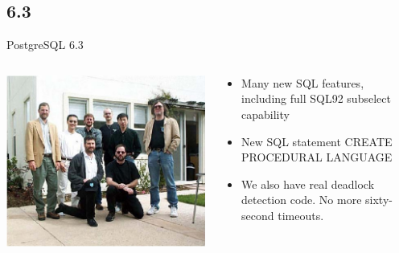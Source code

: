 \documentclass[t,10pt]{beamer}
\begin{document}
\subsection{6.3}
\begin{frame}{PostgreSQL 6.3}
  \begin{columns}[T]
    \begin{column}{0.3\textwidth}
      \includegraphics[width=1.1\textwidth,keepaspectratio=true]{assets/Get_to_know_PostgreSQL-6-team}
    \end{column}
    \begin{column}{0.7\textwidth}
      \begin{itemize}%
      \item Many new SQL features, including full SQL92 subselect capability
      \item New SQL statement CREATE PROCEDURAL LANGUAGE
      \item We also have real deadlock detection code. No more sixty-second timeouts.
      \end{itemize}
    \end{column}
  \end{columns}
\end{frame}
\end{document}
